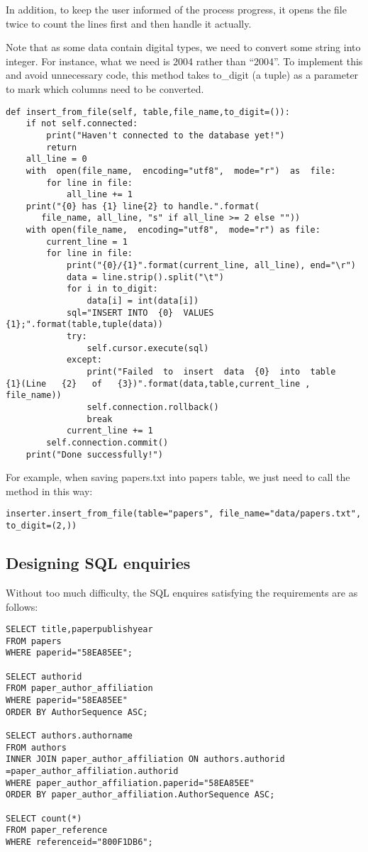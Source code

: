 \documentclass{article}
\begin{document}
In addition, to keep the user informed of the process progress, it
opens  the  file  twice to  count  the  lines  first  and  then  handle  it
actually.

Note that as some data contain digital types, we need to convert
some string into integer. For instance, what we need is 2004 rather
than  “2004”.  To  implement  this  and  avoid  unnecessary  code,  this
method takes to\_digit (a tuple) as a parameter to mark which columns
need to be converted.
            \begin{verbatim}
def insert_from_file(self, table,file_name,to_digit=()):
    if not self.connected:
        print("Haven't connected to the database yet!")
        return
    all_line = 0
    with  open(file_name,  encoding="utf8",  mode="r")  as  file:
        for line in file:
            all_line += 1
    print("{0} has {1} line{2} to handle.".format(
       file_name, all_line, "s" if all_line >= 2 else ""))
    with open(file_name,  encoding="utf8",  mode="r") as file:
        current_line = 1
        for line in file:
            print("{0}/{1}".format(current_line, all_line), end="\r")
            data = line.strip().split("\t")
            for i in to_digit:
                data[i] = int(data[i])
            sql="INSERT INTO  {0}  VALUES  {1};".format(table,tuple(data))
            try:
                self.cursor.execute(sql)
            except:
                print("Failed  to  insert  data  {0}  into  table   {1}(Line   {2}   of   {3})".format(data,table,current_line , file_name))
                self.connection.rollback()
                break
            current_line += 1
        self.connection.commit()
    print("Done successfully!")
            \end{verbatim}
    For example, when saving papers.txt into papers table, we just need
to call the method in this way:
            \begin{verbatim}
inserter.insert_from_file(table="papers", file_name="data/papers.txt", to_digit=(2,))
            \end{verbatim}
        \subsection{Designing SQL enquiries}
Without  too  much  difficulty,  the  SQL  enquires  satisfying  the
requirements are as follows:
            \begin{verbatim}
SELECT title,paperpublishyear
FROM papers
WHERE paperid="58EA85EE";

SELECT authorid
FROM paper_author_affiliation
WHERE paperid="58EA85EE"
ORDER BY AuthorSequence ASC;

SELECT authors.authorname
FROM authors
INNER JOIN paper_author_affiliation ON authors.authorid
=paper_author_affiliation.authorid
WHERE paper_author_affiliation.paperid="58EA85EE"
ORDER BY paper_author_affiliation.AuthorSequence ASC;

SELECT count(*)
FROM paper_reference
WHERE referenceid="800F1DB6";
            \end{verbatim}
\end{document}
